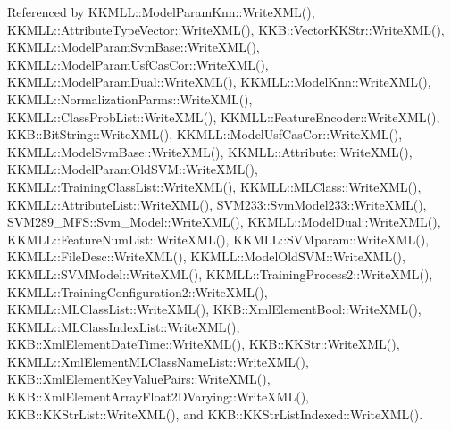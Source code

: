 Referenced by K\+K\+M\+L\+L\+::\+Model\+Param\+Knn\+::\+Write\+X\+M\+L(), K\+K\+M\+L\+L\+::\+Attribute\+Type\+Vector\+::\+Write\+X\+M\+L(), K\+K\+B\+::\+Vector\+K\+K\+Str\+::\+Write\+X\+M\+L(), K\+K\+M\+L\+L\+::\+Model\+Param\+Svm\+Base\+::\+Write\+X\+M\+L(), K\+K\+M\+L\+L\+::\+Model\+Param\+Usf\+Cas\+Cor\+::\+Write\+X\+M\+L(), K\+K\+M\+L\+L\+::\+Model\+Param\+Dual\+::\+Write\+X\+M\+L(), K\+K\+M\+L\+L\+::\+Model\+Knn\+::\+Write\+X\+M\+L(), K\+K\+M\+L\+L\+::\+Normalization\+Parms\+::\+Write\+X\+M\+L(), K\+K\+M\+L\+L\+::\+Class\+Prob\+List\+::\+Write\+X\+M\+L(), K\+K\+M\+L\+L\+::\+Feature\+Encoder\+::\+Write\+X\+M\+L(), K\+K\+B\+::\+Bit\+String\+::\+Write\+X\+M\+L(), K\+K\+M\+L\+L\+::\+Model\+Usf\+Cas\+Cor\+::\+Write\+X\+M\+L(), K\+K\+M\+L\+L\+::\+Model\+Svm\+Base\+::\+Write\+X\+M\+L(), K\+K\+M\+L\+L\+::\+Attribute\+::\+Write\+X\+M\+L(), K\+K\+M\+L\+L\+::\+Model\+Param\+Old\+S\+V\+M\+::\+Write\+X\+M\+L(), K\+K\+M\+L\+L\+::\+Training\+Class\+List\+::\+Write\+X\+M\+L(), K\+K\+M\+L\+L\+::\+M\+L\+Class\+::\+Write\+X\+M\+L(), K\+K\+M\+L\+L\+::\+Attribute\+List\+::\+Write\+X\+M\+L(), S\+V\+M233\+::\+Svm\+Model233\+::\+Write\+X\+M\+L(), S\+V\+M289\+\_\+\+M\+F\+S\+::\+Svm\+\_\+\+Model\+::\+Write\+X\+M\+L(), K\+K\+M\+L\+L\+::\+Model\+Dual\+::\+Write\+X\+M\+L(), K\+K\+M\+L\+L\+::\+Feature\+Num\+List\+::\+Write\+X\+M\+L(), K\+K\+M\+L\+L\+::\+S\+V\+Mparam\+::\+Write\+X\+M\+L(), K\+K\+M\+L\+L\+::\+File\+Desc\+::\+Write\+X\+M\+L(), K\+K\+M\+L\+L\+::\+Model\+Old\+S\+V\+M\+::\+Write\+X\+M\+L(), K\+K\+M\+L\+L\+::\+S\+V\+M\+Model\+::\+Write\+X\+M\+L(), K\+K\+M\+L\+L\+::\+Training\+Process2\+::\+Write\+X\+M\+L(), K\+K\+M\+L\+L\+::\+Training\+Configuration2\+::\+Write\+X\+M\+L(), K\+K\+M\+L\+L\+::\+M\+L\+Class\+List\+::\+Write\+X\+M\+L(), K\+K\+B\+::\+Xml\+Element\+Bool\+::\+Write\+X\+M\+L(), K\+K\+M\+L\+L\+::\+M\+L\+Class\+Index\+List\+::\+Write\+X\+M\+L(), K\+K\+B\+::\+Xml\+Element\+Date\+Time\+::\+Write\+X\+M\+L(), K\+K\+B\+::\+K\+K\+Str\+::\+Write\+X\+M\+L(), K\+K\+M\+L\+L\+::\+Xml\+Element\+M\+L\+Class\+Name\+List\+::\+Write\+X\+M\+L(), K\+K\+B\+::\+Xml\+Element\+Key\+Value\+Pairs\+::\+Write\+X\+M\+L(), K\+K\+B\+::\+Xml\+Element\+Array\+Float2\+D\+Varying\+::\+Write\+X\+M\+L(), K\+K\+B\+::\+K\+K\+Str\+List\+::\+Write\+X\+M\+L(), and K\+K\+B\+::\+K\+K\+Str\+List\+Indexed\+::\+Write\+X\+M\+L().


